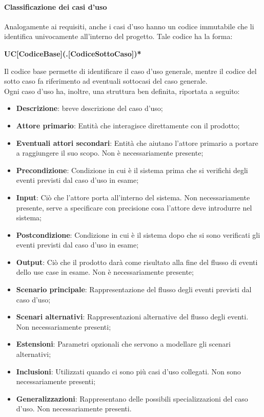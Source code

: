\documentclass[../norme_di_progetto.tex]{subfiles}
\begin{document}
\paragraph{Classificazione dei casi d'uso}
Analogamente ai requisiti, anche i casi d'uso hanno un codice immutabile che li identifica univocamente all'interno del progetto. Tale codice ha la forma:
\begin{center}
    \textbf{UC[CodiceBase](.[CodiceSottoCaso])*}
\end{center}
Il codice base permette di identificare il caso d'uso generale, mentre il codice del sotto caso fa riferimento ad eventuali sottocasi del caso generale.\\
Ogni caso d'uso ha, inoltre, una struttura ben definita, riportata a seguito:
\begin{itemize}
    \item \textbf{Descrizione}: breve descrizione del caso d'uso;
    \item \textbf{Attore primario}: Entità che interagisce direttamente con il prodotto;
    \item \textbf{Eventuali attori secondari}: Entità che aiutano l'attore primario a portare a raggiungere il suo scopo. Non è necessariamente presente;
    \item \textbf{Precondizione}: Condizione in cui è il sistema prima che si verifichi degli eventi previsti dal caso d'uso in esame;
    \item \textbf{Input}: Ciò che l'attore porta all'interno del sistema. Non necessariamente presente, serve a specificare con precisione cosa l'attore deve introdurre nel sistema;
    \item \textbf{Postcondizione}: Condizione in cui è il sistema dopo che si sono verificati gli eventi previsti dal caso d'uso in esame;
    \item \textbf{Output}: Ciò che il prodotto darà come risultato alla fine del flusso di eventi dello use case in esame. Non è necessariamente presente;
    \item \textbf{Scenario principale}: Rappresentazione del flusso degli eventi previsti dal caso d'uso;
    \item \textbf{Scenari alternativi}: Rappresentazioni alternative del flusso degli eventi. Non necessariamente presenti;
    \item \textbf{Estensioni}: Parametri opzionali che servono a modellare gli scenari alternativi;
    \item \textbf{Inclusioni}: Utilizzati quando ci sono più casi d'uso collegati. Non sono necessariamente presenti;
    \item \textbf{Generalizzazioni}: Rappresentano delle possibili specializzazioni del caso d'uso. Non necessariamente presenti.
\end{itemize}
\end{document}

